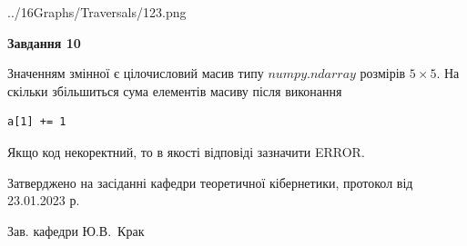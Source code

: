 \documentclass[12pt, ukrainian]{article}
\begin{document}
{\begin {large}
\begin{center}
	{../16Graphs/Traversals/123.png}
\end{center}\par
\newpage

{\begin {center}\textbf{Завдання 10}\end {center}}\par
Значенням змінної  є цілочисловий масив типу $numpy.ndarray$ розмірів $5{\times}5$. На скільки збільшиться сума елементів масиву  після виконання
\begin{verbatim}
a[1] += 1
\end{verbatim}


Якщо код некоректний, то в якості відповіді зазначити ERROR.\par
\newpage


\end {large}
}
{\smallskip \begin {small} Затверджено на засіданні кафедри теоретичної кібернетики, протокол  від   23.01.2023 р.\par\smallskip\smallskip
{\parbox {6.5 cm}{Зав. кафедри \dotfill Ю.В.~Крак}} \end{small}}
\end{document}
